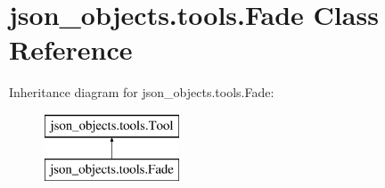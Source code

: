 \hypertarget{classjson__objects_1_1tools_1_1_fade}{
\section{json\_\-objects.tools.Fade Class Reference}
\label{classjson__objects_1_1tools_1_1_fade}
}
Inheritance diagram for json\_\-objects.tools.Fade:\begin{figure}[H]
\begin{center}
\leavevmode
\includegraphics[height=2.000000cm]{classjson__objects_1_1tools_1_1_fade}
\end{center}
\end{figure}
